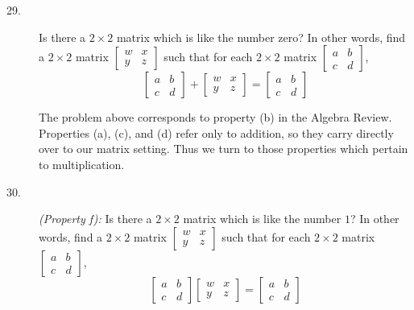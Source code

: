 \documentclass{article}
\begin{document}
\begin{description}

  \item[29.] Is there a $2 \times 2$ matrix which is like the number zero? In other words, find a $2 \times 2$ matrix $\begin{bmatrix} w & x \\ y & z \end{bmatrix}$ such that for each $2 \times 2$ matrix $\begin{bmatrix} a & b \\ c & d \end{bmatrix}$,
    \begin{equation*}
    \begin{bmatrix} a & b \\ c & d \end{bmatrix} + \begin{bmatrix} w & x \\ y & z \end{bmatrix}
    = \begin{bmatrix} a & b \\ c & d \end{bmatrix}
    \end{equation*}

  \item[] The problem above corresponds to property (b) in the Algebra Review. Properties (a), (c), and (d) refer only to addition, so they carry directly over to our matrix setting. Thus we turn to those properties which pertain to multiplication.

  \item[30.] \emph{(Property f):} Is there a $2 \times 2$ matrix which is like the number $1$? In other words, find a $2 \times 2$ matrix $\begin{bmatrix} w & x \\ y & z \end{bmatrix}$ such that for each $2 \times 2$ matrix $\begin{bmatrix} a & b \\ c & d \end{bmatrix}$,
    \begin{equation*}
    \begin{bmatrix} a & b \\ c & d \end{bmatrix} \begin{bmatrix} w & x \\ y & z \end{bmatrix}
    = \begin{bmatrix} a & b \\ c & d \end{bmatrix}
    \end{equation*}


\end{description}
\end{document}
